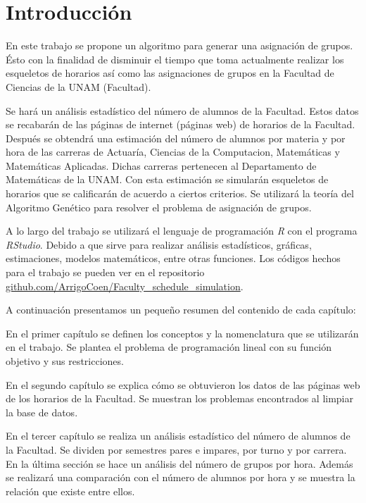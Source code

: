 \chapter*{Introducción}


En este trabajo se propone un algoritmo para generar una asignación de grupos. Ésto con la finalidad de disminuir el tiempo que toma actualmente realizar los esqueletos de horarios así como las asignaciones de grupos en la Facultad de Ciencias de la UNAM (Facultad). 

Se hará un análisis estadístico del número de alumnos de la Facultad. Estos datos se recabarán de las páginas de internet (páginas web) de horarios de la Facultad. Después se obtendrá una estimación del número de alumnos por materia y por hora de las carreras de Actuaría, Ciencias de la Computacion, Matemáticas y Matemáticas Aplicadas. Dichas carreras pertenecen al Departamento de Matemáticas de la UNAM. Con esta estimación se simularán esqueletos de horarios que se calificarán de acuerdo a ciertos criterios. Se utilizará la teoría del Algoritmo Genético para resolver el problema de asignación de grupos. 

A lo largo del trabajo se utilizará el lenguaje de programación \textit{R} con el programa \textit{RStudio}. Debido a que sirve para realizar análisis estadísticos, gráficas, estimaciones, modelos matemáticos, entre otras funciones. Los códigos hechos para el trabajo se pueden ver en el repositorio \url{github.com/ArrigoCoen/Faculty_schedule_simulation}.

A continuación presentamos un pequeño resumen del contenido de cada capítulo:

En el primer capítulo se definen los conceptos y la nomenclatura que se utilizarán en el trabajo. Se plantea el problema de programación lineal con su función objetivo y sus restricciones.

En el segundo capítulo se explica cómo se obtuvieron los datos de las páginas web de los horarios de la Facultad. Se muestran los problemas encontrados al limpiar la base de datos.

En el tercer capítulo se realiza un análisis estadístico del número de alumnos de la Facultad. Se dividen por semestres pares e impares, por turno y por carrera. En la última sección se hace un análisis del número de grupos por hora. Además se realizará una comparación con el número de alumnos por hora y se muestra la relación que existe entre ellos.

